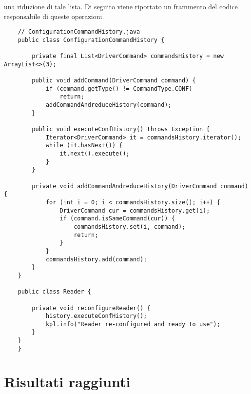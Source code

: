 una riduzione di tale lista. Di seguito viene riportato un frammento del codice responsabile di queste operazioni.
\begin{lstlisting}
    // ConfigurationCommandHistory.java
    public class ConfigurationCommandHistory {

        private final List<DriverCommand> commandsHistory = new ArrayList<>(3);

        public void addCommand(DriverCommand command) {
            if (command.getType() != CommandType.CONF)
                return;
            addCommandAndreduceHistory(command);
        }

        public void executeConfHistory() throws Exception {
            Iterator<DriverCommand> it = commandsHistory.iterator();
            while (it.hasNext()) {
                it.next().execute();
            }
        }

        private void addCommandAndreduceHistory(DriverCommand command) {
            for (int i = 0; i < commandsHistory.size(); i++) {
                DriverCommand cur = commandsHistory.get(i);
                if (command.isSameCommand(cur)) {
                    commandsHistory.set(i, command);
                    return;
                }
            }
            commandsHistory.add(command);
        }
    }

    public class Reader {

        private void reconfigureReader() {
			history.executeConfHistory();
			kpl.info("Reader re-configured and ready to use");
		}
	}
    }
\end{lstlisting}

\section{Risultati raggiunti}
